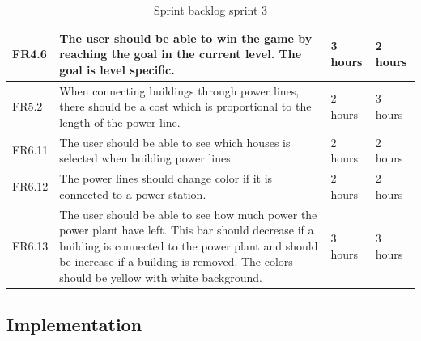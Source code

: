 \begin{table}[H]
\begin{tabular}{| p{1cm} | p{7cm} | p{2cm} | p{2cm} |}
		FR4.6 & The user should be able to win the game by reaching the goal in 
		the current level. The goal is level specific. 
		& 3 hours & 2 hours \\ \hline

		FR5.2 & When connecting buildings through power lines, there should be a 
		cost which is proportional to the length of the power line. 
		& 2 hours & 3 hours \\ \hline

		FR6.11 & The user should be able to see which houses is selected when 
		building power lines 
		& 2 hours & 2 hours \\ \hline

		FR6.12 & The power lines should change color if it is connected to a power 
		station. 
		& 2 hours & 2 hours \\ \hline

		FR6.13 & The user should be able to see how much power the power plant have 
		left. This bar should decrease if a building is connected to the power plant 
		and should be increase if a building is removed. The colors should be yellow 
		with white background. 
		& 3 hours & 3 hours \\ \hline

	\end{tabular}
	\caption{Sprint backlog sprint 3}
	\label{table:backlogsprint3}
	\end{table}

\subsection{Implementation}
	
